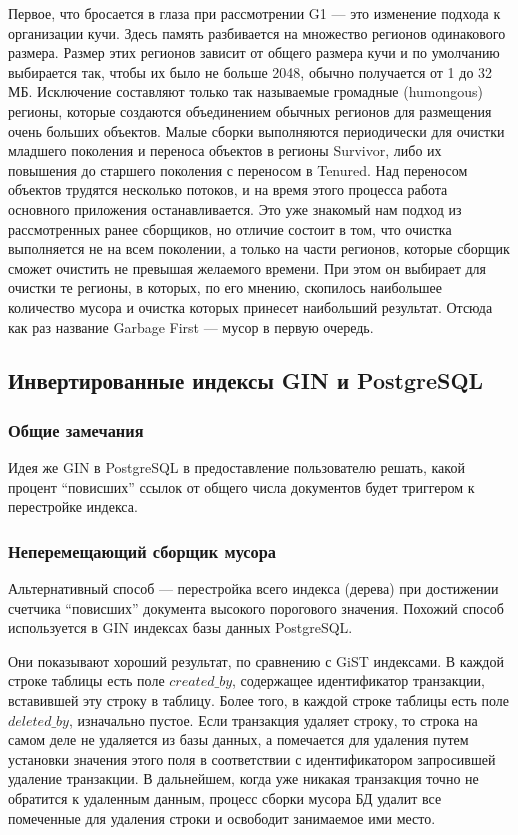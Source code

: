 Первое, что бросается в глаза при рассмотрении G1 — это изменение подхода к организации кучи.
Здесь память разбивается на множество регионов одинакового размера. Размер этих регионов зависит
от общего размера кучи и по умолчанию выбирается так, чтобы их было не больше 2048,
обычно получается от 1 до 32 МБ. Исключение составляют только так называемые громадные (humongous)
регионы, которые создаются объединением обычных регионов для размещения очень больших объектов.
Малые сборки выполняются периодически для очистки младшего поколения и переноса объектов
в регионы Survivor, либо их повышения до старшего поколения с переносом в Tenured.
Над переносом объектов трудятся несколько потоков, и на время этого процесса работа основного
приложения останавливается. Это уже знакомый нам подход из рассмотренных ранее сборщиков,
но отличие состоит в том, что очистка выполняется не на всем поколении, а только на части регионов,
которые сборщик сможет очистить не превышая желаемого времени. При этом он выбирает для очистки те регионы,
в которых, по его мнению, скопилось наибольшее количество мусора и очистка которых принесет наибольший результат.
Отсюда как раз название Garbage First — мусор в первую очередь.

\subsection{Инвертированные индексы GIN и PostgreSQL}

\subsubsection{Общие замечания}

Идея же GIN в PostgreSQL в предоставление пользователю решать, какой процент “повисших” ссылок
от общего числа документов будет триггером к перестройке индекса. 

\subsubsection{Неперемещающий сборщик мусора}

Альтернативный способ — перестройка всего индекса (дерева) при достижении счетчика “повисших”
документа высокого порогового значения. Похожий способ используется в GIN индексах базы данных PostgreSQL.

Они показывают хороший результат, по сравнению с GiST индексами. В каждой строке таблицы есть поле
$created\_by$, содержащее идентификатор транзакции, вставившей эту строку в таблицу. Более того, в каждой
строке таблицы есть поле $deleted\_by$, изначально пустое. Если транзакция удаляет строку, то строка
на самом деле не удаляется из базы данных, а помечается для удаления путем установки значения этого поля
в соответствии с идентификатором запросившей удаление транзакции. В дальнейшем, когда уже никакая транзакция
точно не обратится к удаленным данным, процесс сборки мусора БД удалит все помеченные для удаления строки
и освободит занимаемое ими место.

